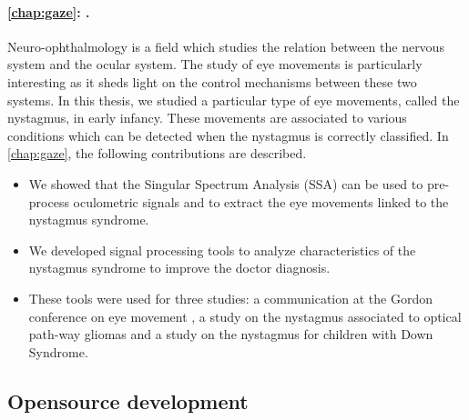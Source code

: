 \documentclass[../thesis.tex]{subfiles}
\begin{document}



\paragraph{\autoref{chap:gaze}: .}
\label{ssub:contrib:oculo}

Neuro-ophthalmology is a field which studies the relation between the nervous system and the ocular system. The study of eye movements is particularly interesting as it sheds light on the control mechanisms between these two systems. In this thesis, we studied a particular type of eye movements, called the nystagmus, in early infancy. These movements are associated to various conditions which can be detected when the nystagmus is correctly classified. In \autoref{chap:gaze}, the following contributions are described.

\begin{itemize}\itemsep.3em
	\renewcommand{\labelitemi}{\raisebox{-.1em}{\color{linkcolor!50}$\blacktriangleright$}}
	\item We showed that the Singular Spectrum Analysis (SSA) can be used to pre-process
	oculometric signals and to extract the eye movements linked to the nystagmus syndrome.

	\item We developed signal processing tools to analyze characteristics of the nystagmus syndrome
	to improve the doctor diagnosis.

	\item These tools were used for three studies: a communication at the Gordon
	conference  on eye movement \citep{Robert2015}, a study on the nystagmus associated to
	optical path-way gliomas \citep{Robert2016} and a study on the nystagmus for children
	with Down Syndrome.
\end{itemize}
	







\subsection{Opensource development}
\label{sub:intro:contrib:oss}
\end{document}
